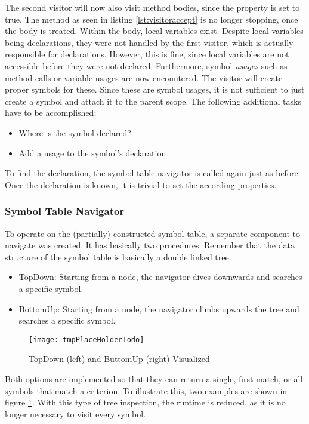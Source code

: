 The second visitor will now also visit method bodies, since the  property is set to true.
The  method as seen in listing \ref{lst:visitoraccept} is no longer stopping, once the body is treated.
Within the body, local variables exist.
Despite local variables being declarations, they were not handled by the first visitor, which is actually responsible for declarations.
However, this is fine, since local variables are not accessible before they were not declared.
Furthermore, symbol \textit{usages} such as method calls or variable usages are now encountered.
The visitor will create proper symbols for these.
Since these are symbol usages, it is not sufficient to just create a symbol and attach it to the parent scope.
The following additional tasks have to be accomplished:
\begin{itemize}
    \item Where is the symbol declared?
    \item Add a usage to the symbol's declaration
\end{itemize}

To find the declaration, the symbol table navigator is called again just as before.
Once the declaration is known, it is trivial to set the according properties.

\subsubsection{Symbol Table Navigator}
To operate on the (partially) constructed symbol table, a separate component to navigate was created.
It has basically two procedures.
Remember that the data structure of the symbol table is basically a double linked tree.

\begin{itemize}
\item TopDown: Starting from a node, the navigator dives downwards and searches a specific symbol.
\item BottomUp: Starting from a node, the navigator climbs upwards the tree and searches a specific symbol.
\end{itemize}

\begin{figure}[H]
    \centering
    \texttt{[image: tmpPlaceHolderTodo]}
    \caption{TopDown (left) and ButtomUp (right) Visualized}
    \label{fig:impl_symboltablenav}
\end{figure}

Both options are implemented so that they can return a single, first match, or all symbols that match a criterion.
To illustrate this, two examples are shown in figure \ref{fig:impl_symboltablenav}.
With this type of tree inspection, the runtime is reduced, as it is no longer necessary to visit every symbol.

